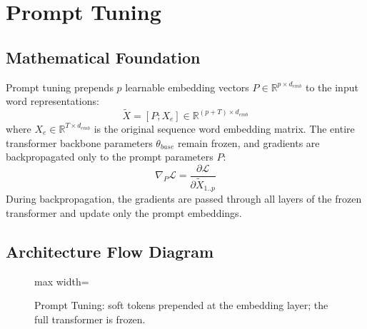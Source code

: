 \documentclass{article}
\begin{document}
\newpage
\section{Prompt Tuning}

\subsection{Mathematical Foundation}
Prompt tuning prepends $p$ learnable embedding vectors $P \in \mathbb{R}^{p \times d_{emb}}$ to the input word representations:
\begin{equation}
  \tilde{X} = [P ; X_e] \in \mathbb{R}^{(p + T) \times d_{emb}}
\end{equation}
where $X_e \in \mathbb{R}^{T \times d_{emb}}$ is the original sequence word embedding matrix. The entire transformer backbone parameters $\theta_{base}$ remain frozen, and gradients are backpropagated only to the prompt parameters $P$:
\begin{equation}
  \nabla_P \mathcal{L} = \frac{\partial \mathcal{L}}{\partial \tilde{X}_{1..p}}
\end{equation}
During backpropagation, the gradients are passed through all layers of the frozen transformer and update only the prompt embeddings.

\subsection{Architecture Flow Diagram}

\begin{figure}[h]
\centering
\begin{adjustbox}{max width=\linewidth}
\end{adjustbox}
\caption{Prompt Tuning: soft tokens prepended at the embedding layer; the full transformer is frozen.}
\end{figure}
\end{document}
